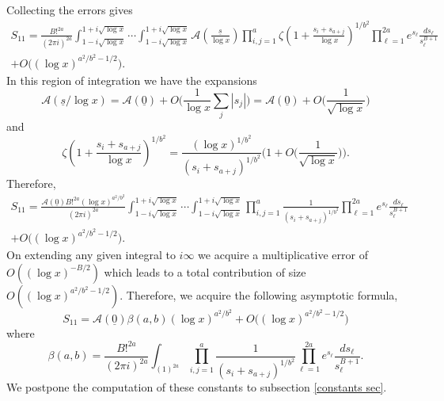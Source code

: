 \documentclass[oneside, 12pt]{amsart}
\theoremstyle{definition}
\newcommand{\mc}{\mathcal}
\newcommand{\ul}{\underline}
\begin{document}
Collecting the errors gives
\begin{multline*}
S_{11}
=
\frac{B!^{2a}}{(2\pi i)^{2a}}\int_{1-i\sqrt{\log x}}^{1+i\sqrt{\log x}} \!\!\!\cdots \!\!\int_{1-i\sqrt{\log x}}^{1+i\sqrt{\log x}}
 \mc{A}(\frac{\ul{s}}{\log x}) \prod_{i,j=1}^a\zeta\left(1+\frac{s_i+s_{a+j}}{\log x}\right)^{1/b^2} \prod_{\ell=1}^{2a}e^{s_\ell}\frac{ds_\ell}{s_\ell^{B+1}}
\\
+O\big( (\log x)^{a^2/b^2-1/2}\big).
\end{multline*}
In this region of integration we have the expansions
\begin{equation}
\label{A taylor}
 \mc{A}(\ul{s}/\log x)= \mc{A}(\ul{0})+O\big(\frac{1}{\log x}\sum_{j} |s_j|\big)= \mc{A}(\ul{0})+O\big(\frac{1}{\sqrt{\log x}}\big)
\end{equation}
and 
\begin{equation}
\label{zeta laurent}
\zeta\left(1+\frac{s_i+s_{a+j}}{\log x}\right)^{1/b^2}=\frac{(\log x)^{1/b^2}}{(s_i+s_{a+j})^{1/b^2}}\Big(1+O\big(\frac{1}{\sqrt{\log x}}\big)\Big).
\end{equation}
Therefore,
\begin{multline*}
 S_{11} =  \frac{ \mc{A}(\ul{0})B!^{2a}\left(\log x\right)^{a^2/b^2}}{(2\pi i )^{2a}} \int_{1-i\sqrt{\log x}}^{1+i\sqrt{\log x}} \!\!\!\cdots \int_{1-i\sqrt{\log x}}^{1+i\sqrt{\log x}} \prod_{i,j=1}^a\frac{1}{(s_i+s_{a+j})^{1/b^2}} 
 \prod_{\ell=1}^{2a}e^{s_\ell}\frac{ds_\ell}{s_\ell^{B+1}}
\\  +O\big( (\log x)^{a^2/b^2-1/2}\big).
\end{multline*}
On extending any given integral to $i\infty$ we acquire a multiplicative error of $O((\log x)^{-B/2})$ which leads to a total contribution of size $O((\log x)^{a^2/b^2-1/2})$. Therefore, we acquire the following asymptotic formula, 
\begin{equation}
\label{S_11 asymp}
S_{11}=  \mc{A}(\ul{0}) \beta(a,b) (\log x)^{a^2/b^2}+O\big( (\log x)^{a^2/b^2-1/2}\big)
\end{equation}
where
\[
\beta(a,b)=
 \frac{B!^{2a} }{(2\pi i )^{2a}} \int_{(1)^{2a}} \prod_{i,j=1}^a\frac{1}{(s_i+s_{a+j})^{1/b^2}} 
 \prod_{\ell=1}^{2a}e^{s_\ell}\frac{ds_\ell}{s_\ell^{B+1}}.
\]
We postpone the computation of these constants to subsection \ref{constants sec}.
\end{document}
